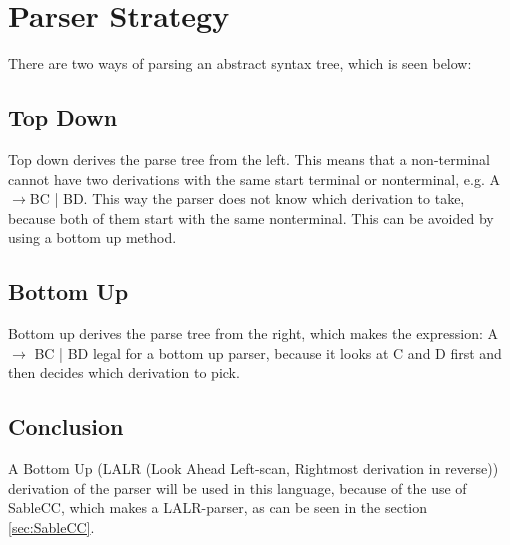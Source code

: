 \section{Parser Strategy}
\label{Parserstrategy}
There are two ways of parsing an abstract syntax tree, which is seen below:

\subsection*{Top Down}
Top down derives the parse tree from the left. This means that a non-terminal cannot have two derivations with the same start terminal or nonterminal, e.g. A $\rightarrow$BC | BD. This way the parser does not know which derivation to take, because both of them start with the same nonterminal.
This can be avoided by using a bottom up method.

\subsection*{Bottom Up}
Bottom up derives the parse tree from the right, which makes the expression: A $\rightarrow$ BC | BD legal for a bottom up parser, because it looks at C and D first and then decides which derivation to pick.

\subsection*{Conclusion}
A Bottom Up (LALR (Look Ahead Left-scan, Rightmost derivation in reverse)) derivation of the parser will be used in this language, because of the use of SableCC, which makes a LALR-parser, as can be seen in the section \ref{sec:SableCC}.